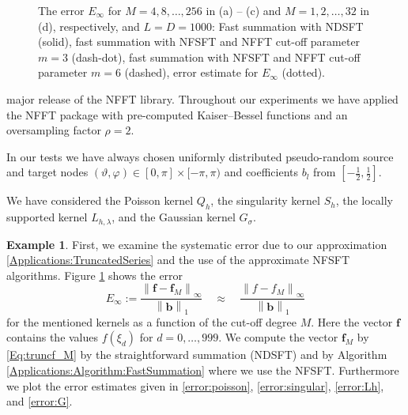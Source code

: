 \documentclass[11pt,a4paper,twoside,bibtotoc]{scrartcl}
\theoremstyle{plain}
\theoremstyle{definition}
\newtheorem{example}[theorem]{Example}
\theoremstyle{remark}
\numberwithin{equation}{section}
\numberwithin{table}{section}
\numberwithin{figure}{section}
\begin{document}
\begin{figure}[tb]
  \caption{The error $E_{\infty}$ for $M = 4,8,\ldots,256$ in (a) -- (c) and 
  $M = 1,2,\ldots,32$ in (d), respectively, 
  and $L = D = 1000$: Fast summation with NDSFT (solid), fast summation with NFSFT and 
  NFFT cut-off parameter $m = 3$ (dash-dot), fast summation with NFSFT and NFFT cut-off 
  parameter $m = 6$ (dashed), error estimate for 
  $E_{\infty}$ (dotted).}
  \label{fig:error}
\end{figure}

major release of the NFFT library. Throughout our experiments we have 
applied the NFFT package \cite{kupo02C} with pre-computed Kaiser--Bessel 
functions and an oversampling factor $\rho=2$.

In our tests we have always chosen uniformly distributed pseudo-random 
source and target nodes 
$\left(\vartheta,\varphi\right) \in [0,\pi] \times [-\pi,\pi)$ and 
coefficients $b_l$ from $\left[-\frac{1}{2},\frac{1}{2}\right]$.

We have considered the Poisson kernel $Q_{h}$,
the singularity kernel $S_{h}$,
the locally supported kernel $L_{h,\lambda}$,
and the Gaussian kernel $G_{\sigma}$.

\begin{example}
First, we examine the systematic error due to our approximation
\eqref{Applications:TruncatedSeries} and the use of the approximate NFSFT
algorithms. Figure \ref{fig:error} shows the error
\[
E_{\infty}:=
\frac{\left\|\mathbf{f}-\mathbf{f}_M\right\|_{\infty}}{\left\|\mathbf{b}\right\|_{1}}
\quad \approx \quad \frac{\left\|f-f_M\right\|_{\infty}}{\left\|\mathbf{b}\right\|_{1}}
\]
for the mentioned kernels as a function of the cut-off degree $M$.
Here the vector $\mathbf{f}$ contains the values $f(\xi_d)$ for
$d=0,\ldots, 999$. We compute the vector $\mathbf{f}_M$ by
\eqref{Eq:truncf_M} by the straightforward summation (NDSFT) and by
Algorithm  \ref{Applications:Algorithm:FastSummation} where we use the NFSFT.
Furthermore we plot the error estimates given in \eqref{error:poisson},
\eqref{error:singular}, \eqref{error:Lh}, and \eqref{error:G}.
\end{example}
\end{document}
